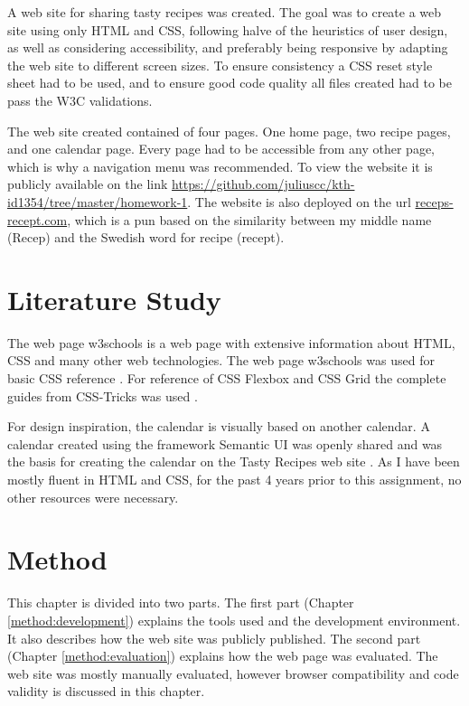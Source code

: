 \documentclass[a4paper]{scrartcl}
\begin{document}
A web site for sharing tasty recipes was created. The goal was to create a web site using only HTML and CSS, following halve of the heuristics of user design, as well as considering accessibility, and preferably being responsive by adapting the web site to different screen sizes. To ensure consistency a CSS reset style sheet had to be used, and to ensure good code quality all files created had to be pass the W3C validations.

The web site created contained of four pages. One home page, two recipe pages, and one calendar page. Every page had to be accessible from any other page, which is why a navigation menu was recommended. To view the website it is publicly available on the link \href{https://github.com/juliuscc/kth-id1354/tree/master/homework-1}{https://github.com/juliuscc/kth-id1354/tree/master/homework-1}. The website is also deployed on the url \href{https://receps-recept.com}{receps-recept.com}, which is a pun based on the similarity between my middle name (Recep) and the Swedish word for recipe (recept).

\section{Literature Study}

The web page w3schools is a web page with extensive information about HTML, CSS and many other web technologies. The web page w3schools was used for basic CSS reference \cite{RefsnesData}. For reference of CSS Flexbox and CSS Grid the complete guides from CSS-Tricks was used \cite{Coyier,Coyiera}. 

For design inspiration, the calendar is visually based on another calendar. A calendar created using the framework Semantic UI was openly shared and was the basis for creating the calendar on the Tasty Recipes web site \cite{Nijin39} . As I have been mostly fluent in HTML and CSS, for the past 4 years prior to this assignment, no other resources were necessary.

\section{Method}
This chapter is divided into two parts. The first part (Chapter \ref{method:development}) explains the tools used and the development environment. It also describes how the web site was publicly published. The second part (Chapter \ref{method:evaluation}) explains how the web page was evaluated. The web site was mostly manually evaluated, however browser compatibility and code validity is discussed in this chapter.
\end{document}
